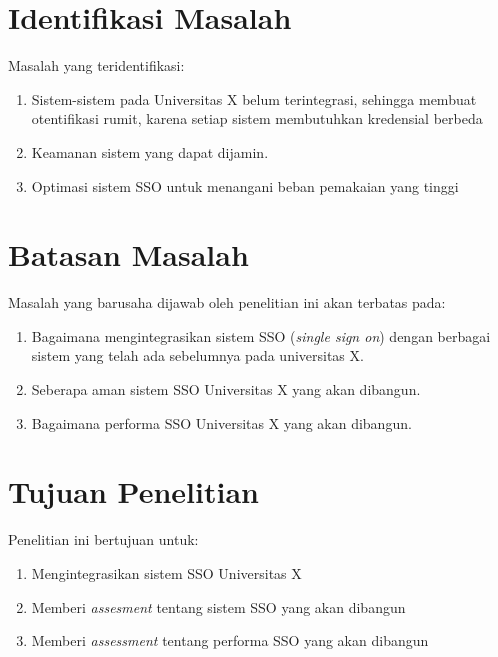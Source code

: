 \documentclass[12pt]{article}
\begin{document}

\section{Identifikasi Masalah}
Masalah yang teridentifikasi:
\begin{enumerate}
    \item Sistem-sistem pada Universitas X belum terintegrasi, sehingga membuat otentifikasi rumit, karena setiap sistem membutuhkan kredensial berbeda
    \item Keamanan sistem yang dapat dijamin.
    \item Optimasi sistem SSO untuk menangani beban pemakaian yang tinggi
\end{enumerate}
\section{Batasan Masalah}
Masalah yang barusaha dijawab oleh penelitian ini akan terbatas pada:
\begin{enumerate}
    \item Bagaimana mengintegrasikan sistem SSO (\emph{single sign on}) dengan berbagai sistem yang telah ada sebelumnya pada universitas X.
    \item Seberapa aman sistem SSO Universitas X yang akan dibangun.
    \item Bagaimana performa SSO Universitas X yang akan dibangun.
\end{enumerate}
\section{Tujuan Penelitian}
Penelitian ini bertujuan untuk:
\begin{enumerate}
    \item Mengintegrasikan sistem SSO Universitas X
    \item Memberi \emph{assesment} tentang sistem SSO yang akan dibangun
    \item Memberi \emph{assessment} tentang performa SSO yang akan dibangun
\end{enumerate}
\end{document}
